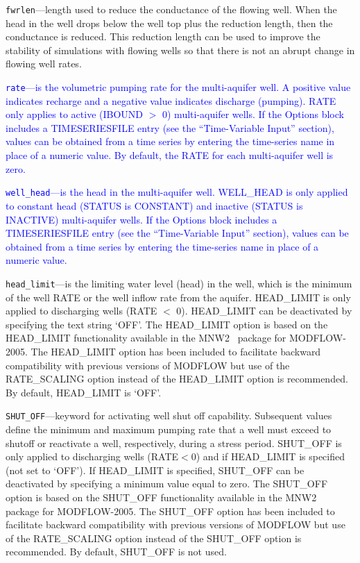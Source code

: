 \begin{description}
\item \texttt{fwrlen}---length used to reduce the conductance of the flowing well.  When the head in the well drops below the well top plus the reduction length, then the conductance is reduced.  This reduction length can be used to improve the stability of simulations with flowing wells so that there is not an abrupt change in flowing well rates.

\item \textcolor{blue}{\texttt{rate}---is the volumetric pumping rate for the multi-aquifer well. A positive value indicates recharge and a negative value indicates discharge (pumping). RATE only applies to active (IBOUND $>$ 0) multi-aquifer wells. If the Options block includes a TIMESERIESFILE entry (see the ``Time-Variable Input'' section), values can be obtained from a time series by entering the time-series name in place of a numeric value. By default, the RATE for each multi-aquifer well is zero.}

\item \textcolor{blue}{\texttt{well\_head}---is the head in the multi-aquifer well. WELL\_HEAD is only applied to constant head (STATUS is CONSTANT) and inactive (STATUS is INACTIVE) multi-aquifer wells. If the Options block includes a TIMESERIESFILE entry (see the ``Time-Variable Input'' section), values can be obtained from a time series by entering the time-series name in place of a numeric value.}

\item \texttt{head\_limit}---is the limiting water level (head) in the well, which is the minimum of the well RATE or the well inflow rate from the aquifer. HEAD\_LIMIT is only applied to discharging wells (RATE $<$ 0). HEAD\_LIMIT can be deactivated by specifying the text string `OFF'. The HEAD\_LIMIT option is based on the HEAD\_LIMIT functionality available in the MNW2~\citep{konikow2009} package for MODFLOW-2005. The HEAD\_LIMIT option has been included to facilitate backward compatibility with previous versions of MODFLOW but use of the RATE\_SCALING option instead of the HEAD\_LIMIT option is recommended. By default, HEAD\_LIMIT is `OFF'.

\item \texttt{SHUT\_OFF}---keyword for activating well shut off capability.  Subsequent values define the minimum and maximum pumping rate that a well must exceed to shutoff or reactivate a well, respectively, during a stress period. SHUT\_OFF is only applied to discharging wells (RATE$<0$) and if HEAD\_LIMIT is specified (not set to `OFF').  If HEAD\_LIMIT is specified, SHUT\_OFF can be deactivated by specifying a minimum value equal to zero. The SHUT\_OFF option is based on the SHUT\_OFF functionality available in the MNW2~\citep{konikow2009} package for MODFLOW-2005. The SHUT\_OFF option has been included to facilitate backward compatibility with previous versions of MODFLOW but use of the RATE\_SCALING option instead of the SHUT\_OFF option is recommended. By default, SHUT\_OFF is not used.


\end{description}
